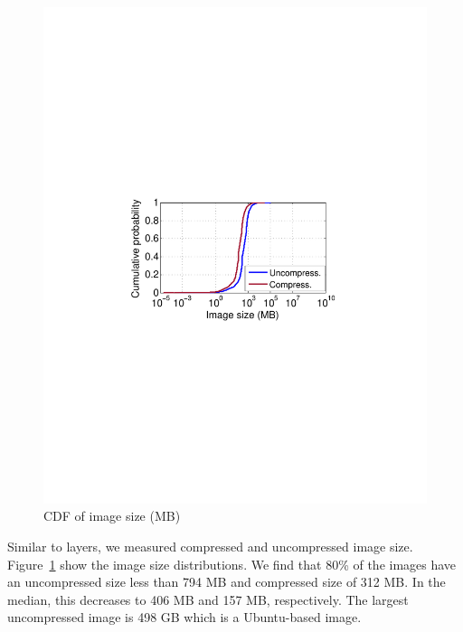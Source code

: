 \begin{figure}[t]
\begin{minipage}{0.22\textwidth}
		\centering
		\includegraphics[width=1\textwidth]{graphs/image-size-cdf.pdf}
		\caption{CDF of image size (MB)}
		\label{fig:image-size-cdf}
	\end{minipage}%
\end{figure}

%

Similar to layers, we measured compressed and uncompressed image size. Figure~\ref{fig:image-size-cdf} show the image size distributions. 
We find that 80\% of the images have an uncompressed size less than
794 MB and compressed size of 312 MB.
In the median, this decreases to 406 MB and 157 MB, respectively. The largest
uncompressed image is 498 GB which is a Ubuntu-based image.  

